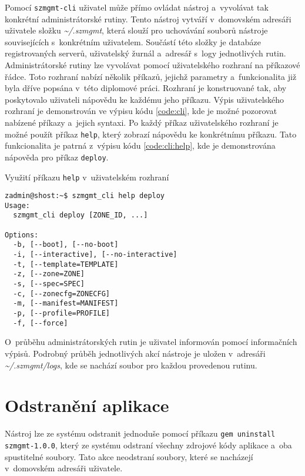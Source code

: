 Pomocí \texttt{szmgmt-cli} uživatel může přímo ovládat nástroj a~vyvolávat tak konkrétní administrátorské rutiny. Tento nástroj
vytváří v~domovském adresáři uživatele složku \textit{\textasciitilde/.szmgmt}, která slouží pro uchovávání souborů nástroje
souvisejících s~konkrétním uživatelem. Součástí této složky je databáze registrovaných serverů, uživatelský žurnál a~adresář
s~logy jednotlivých rutin. Administrátorské rutiny lze vyvolávat pomocí uživatelského rozhraní na příkazové řádce. Toto rozhraní
nabízí několik příkazů, jejichž parametry a~funkcionalita již byla dříve popsána v~této diplomové práci. Rozhraní je konstruované
tak, aby poskytovalo uživateli nápovědu ke každému jeho příkazu. Výpis uživatelského rozhraní je demonstrován ve výpisu kódu
\ref{code:cli}, kde je možné pozorovat nabízené příkazy a~jejich syntaxi. Po každý příkaz uživatelského rozhraní je možné použít
příkaz \texttt{help}, který zobrazí nápovědu ke konkrétnímu příkazu. Tato funkcionalita je patrná z~výpisu kódu \ref{code:cli:help},
kde je demonstrována nápověda pro příkaz \texttt{deploy}.
\begin{listing} 
 \caption{Využití příkazu \texttt{help} v~uživatelském rozhraní}
 \begin{verbatim}
zadmin@shost:~$ szmgmt_cli help deploy
Usage:
  szmgmt_cli deploy [ZONE_ID, ...]

Options:
  -b, [--boot], [--no-boot]      
  -i, [--interactive], [--no-interactive]
  -t, [--template=TEMPLATE]
  -z, [--zone=ZONE]
  -s, [--spec=SPEC]
  -c, [--zonecfg=ZONECFG]
  -m, [--manifest=MANIFEST]
  -p, [--profile=PROFILE]
  -f, [--force]
 \end{verbatim}
 \label{code:cli:help}
\end{listing}
O~průběhu administrátorských rutin je uživatel informován pomocí informačních výpisů. Podrobný průběh jednotlivých akcí nástroje
je uložen v~adresáři \textit{\textasciitilde/.szmgmt/logs}, kde se nachází soubor pro každou provedenou rutinu.
\section{Odstranění aplikace}
\label{appendix:installation:delete}
Nástroj lze ze systému odstranit jednoduše pomocí příkazu \texttt{gem uninstall szmgmt-1.0.0}, který ze systému odstraní všechny
zdrojové kódy aplikace a~oba spustitelné soubory. Tato akce neodstraní soubory, které se nacházejí v~domovském adresáři uživatele.